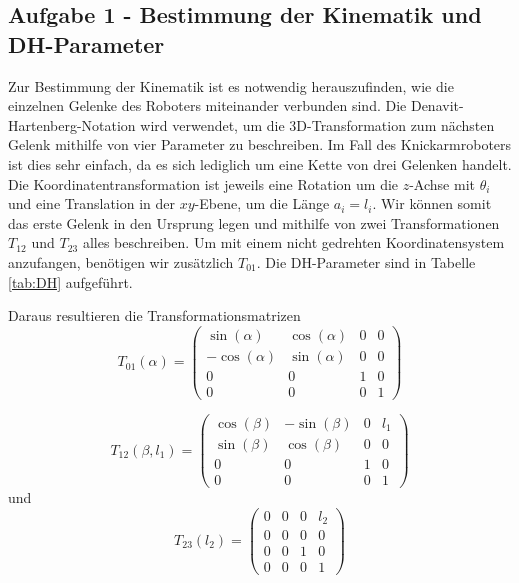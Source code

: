\subsection*{Aufgabe 1 - Bestimmung der Kinematik und DH-Parameter}

Zur Bestimmung der Kinematik ist es notwendig herauszufinden, wie die einzelnen Gelenke des Roboters miteinander verbunden sind.
Die Denavit-Hartenberg-Notation wird verwendet, um die 3D-Transformation zum nächsten Gelenk mithilfe von vier Parameter zu beschreiben. Im Fall des Knickarmroboters ist
dies sehr einfach, da es sich lediglich um eine Kette von drei Gelenken handelt. Die Koordinatentransformation ist jeweils eine Rotation um die $z$-Achse mit $\theta_i$
und eine Translation in der $xy$-Ebene, um die Länge $a_i = l_i$. Wir können somit das erste Gelenk in den Ursprung legen und mithilfe von zwei Transformationen $T_{12}$ 
und $T_{23}$ alles beschreiben. Um mit einem nicht gedrehten Koordinatensystem anzufangen, benötigen wir zusätzlich $T_{01}$. Die DH-Parameter sind in Tabelle \ref{tab:DH} aufgeführt.



Daraus resultieren die Transformationsmatrizen
\begin{equation*}
	T_{01}(\alpha) = \begin{pmatrix}
	\sin(\alpha) & \cos(\alpha) & 0 & 0 \\
	-\cos(\alpha) & \sin(\alpha) & 0 & 0 \\
	0 & 0 & 1 & 0 \\
	0 & 0 & 0 & 1
	\end{pmatrix}
\end{equation*}
	
\begin{equation*}
	T_{12}(\beta, l_1) = \begin{pmatrix}
	\cos(\beta) & -\sin(\beta) & 0 & l_1 \\
	\sin(\beta) & \cos(\beta) & 0 & 0 \\
	0 & 0 & 1 & 0 \\
	0 & 0 & 0 & 1
	\end{pmatrix}
\end{equation*}
und
\begin{equation*}
	T_{23}(l_2) = \begin{pmatrix}
	0 & 0 & 0 & l_2 \\
	0 & 0 & 0 & 0 \\
	0 & 0 & 1 & 0 \\
	0 & 0 & 0 & 1
	\end{pmatrix}
\end{equation*}

